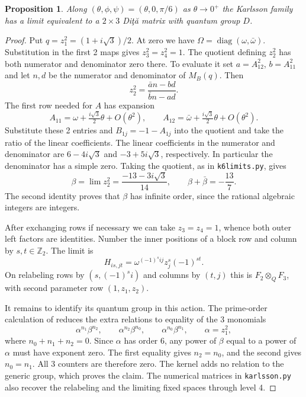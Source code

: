 \documentclass[11pt,a4paper]{amsart}
\newtheorem{proposition}[theorem]{Proposition}
\begin{document}
\begin{proposition}\label{prop:karlpoint}
Along $(\theta,\phi,\psi)=(\theta,0,\pi/6)$ as $\theta\to0^+$ the Karlsson family has a limit equivalent to a $2\times3$ Di\c t\u a matrix with quantum group $D$.
\end{proposition}
\begin{proof}
Put $q=z_1^2=(1+i\sqrt3)/2$. At zero we have $\Omega=\operatorname{diag}(\omega,\bar\omega)$. Substitution in the first 2 maps gives $z_3^2=z_4^2=1$. The quotient defining $z_2^2$ has both numerator and denominator zero there. To evaluate it set $a=A_{12}^2$, $b=A_{11}^2$ and let $n,d$ be the numerator and denominator of $M_B(q)$. Then
\[
 z_2^2=\frac{\bar a n-bd}{\bar b n-ad}.
\]
The first row needed for $A$ has expansion
\[
 A_{11}=\omega+\tfrac{i\sqrt3}{2}\theta+O(\theta^2),\qquad
 A_{12}=\bar\omega+\tfrac{i\sqrt3}{2}\theta+O(\theta^2).
\]
Substitute these 2 entries and $B_{1j}=-1-A_{1j}$ into the quotient and take the ratio of the linear coefficients. The linear coefficients in the numerator and denominator are $6-4i\sqrt3$ and $-3+5i\sqrt3$, respectively. In particular the denominator has a simple zero. Taking the quotient, as in \texttt{k6limits.py}, gives
\[
 \beta=\lim z_2^2=\frac{-13-3i\sqrt3}{14},
 \qquad \beta+\bar\beta=-\frac{13}{7}.
\]
The second identity proves that $\beta$ has infinite order, since the rational algebraic integers are integers.

After exchanging rows if necessary we can take $z_3=z_4=1$, whence both outer left factors are identities. Number the inner positions of a block row and column by $s,t\in\mathbb Z_2$. The limit is
\[
 H_{is,jt}=\omega^{(-1)^sij}z_j^s(-1)^{st}.
\]
On relabeling rows by $(s,(-1)^si)$ and columns by $(t,j)$ this is $F_2\otimes_Q F_3$, with second parameter row $(1,z_1,z_2)$.

It remains to identify its quantum group in this action. The prime-order calculation of \cite[Theorem 4.6]{bo} reduces the extra relations to equality of the 3 monomials
\[
 \alpha^{n_1}\beta^{n_2},\qquad
 \alpha^{n_2}\beta^{n_0},\qquad
 \alpha^{n_0}\beta^{n_1},\qquad \alpha=z_1^2 ,
\]
where $n_0+n_1+n_2=0$. Since $\alpha$ has order 6, any power of $\beta$ equal to a power of $\alpha$ must have exponent zero. The first equality gives $n_2=n_0$, and the second gives $n_0=n_1$. All 3 counters are therefore zero. The kernel adds no relation to the generic group, which proves the claim. The numerical matrices in \texttt{karlsson.py} also recover the relabeling and the limiting fixed spaces through level 4.
\end{proof}
\end{document}
